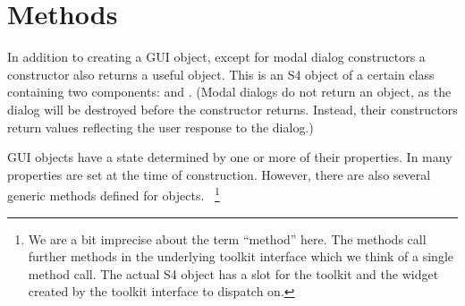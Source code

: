 




\section{Methods}


In addition to creating a GUI object, except for modal dialog
constructors a constructor also returns a useful \R\/ object. This is
an S4 object of a certain class containing two components:
 and . (Modal dialogs do not return an
object, as the dialog will be destroyed before the constructor
returns. Instead, their constructors return values reflecting the user
response to the dialog.)


GUI objects have a state determined by one or more of their
properties. In  many properties are set at the time of
construction. However, there are also several generic methods defined
for  objects. ~\footnote{
  We are a bit imprecise about the term ``method'' here. The 
  methods call further methods in the underlying toolkit interface
  which we think of a single method call. The actual S4 object has a
  slot for the toolkit and the widget created by the
  toolkit interface to dispatch on. 
}

